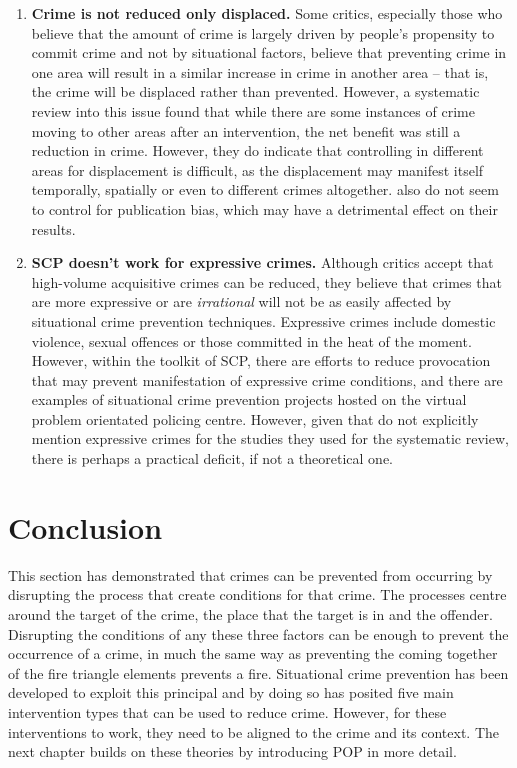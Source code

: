 \begin{enumerate}

 \item{\bf{Crime is not reduced only displaced.} }Some critics, especially those who believe that the amount of crime is largely driven by people’s propensity to commit crime and not by situational factors, believe that preventing crime in one area will result in a similar increase in crime in another area – that is, the crime will be displaced rather than prevented. However, a systematic review into this issue \parencite{guerette2009assessing} found that while there are some instances of crime moving to other areas after an intervention, the net benefit was still a reduction in crime. However, they do indicate that controlling in different areas for displacement is difficult, as the displacement may manifest itself temporally, spatially or even to different crimes altogether.\textcite{guerette2009assessing} also do not seem to control for publication bias, which may have a detrimental effect on their results. 
  
 \item{\bf{SCP doesn't work for expressive crimes.}} Although critics accept that high-volume acquisitive crimes can be reduced, they believe that crimes that are more expressive or are \emph{irrational} will not be as easily affected by situational crime prevention techniques. Expressive crimes include domestic violence, sexual offences or those committed in the heat of the moment. However, within the toolkit of SCP, there are efforts to reduce provocation that may prevent manifestation of expressive crime conditions, and there are examples of situational crime prevention projects hosted on the virtual problem orientated policing centre. However, given that \parencite{guerette2009assessing} do not explicitly mention expressive crimes for the studies they used for the systematic review, there is perhaps a practical deficit, if not a theoretical one.
 
 \end{enumerate}


\section{Conclusion} This section has demonstrated that crimes can be prevented from occurring by disrupting the process that create conditions for that crime. The processes centre around the target of the crime, the place that the target is in and the offender. Disrupting the conditions of any these three factors can be enough to prevent the occurrence of a crime, in much the same way as preventing the coming together of the fire triangle elements prevents a fire. Situational crime prevention has been developed to exploit this principal and by doing so has posited five main intervention types that can be used to reduce crime. However, for these interventions to work, they need to be aligned to the crime and its context. The next chapter builds on these theories by introducing POP in more detail.

